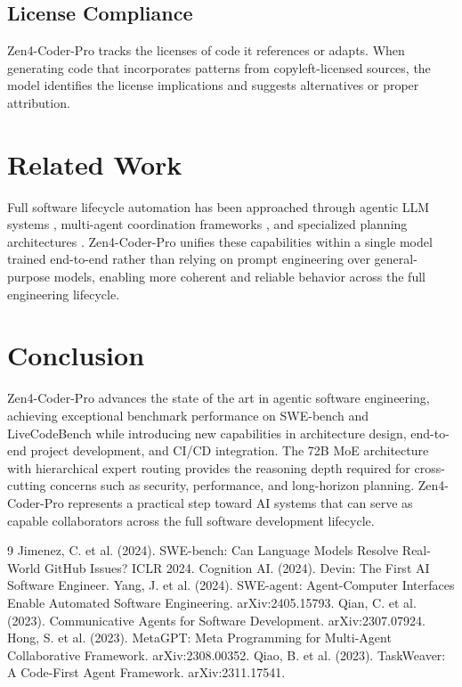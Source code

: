 \documentclass[11pt,a4paper]{article}
\begin{document}
\subsection{License Compliance}

Zen4-Coder-Pro tracks the licenses of code it references or adapts. When generating code that incorporates patterns from copyleft-licensed sources, the model identifies the license implications and suggests alternatives or proper attribution.

\section{Related Work}

Full software lifecycle automation has been approached through agentic LLM systems \cite{devin,swebenchagent}, multi-agent coordination frameworks \cite{chatdev,metagpt}, and specialized planning architectures \cite{taskweaver}. Zen4-Coder-Pro unifies these capabilities within a single model trained end-to-end rather than relying on prompt engineering over general-purpose models, enabling more coherent and reliable behavior across the full engineering lifecycle.

\section{Conclusion}

Zen4-Coder-Pro advances the state of the art in agentic software engineering, achieving exceptional benchmark performance on SWE-bench and LiveCodeBench while introducing new capabilities in architecture design, end-to-end project development, and CI/CD integration. The 72B MoE architecture with hierarchical expert routing provides the reasoning depth required for cross-cutting concerns such as security, performance, and long-horizon planning. Zen4-Coder-Pro represents a practical step toward AI systems that can serve as capable collaborators across the full software development lifecycle.

\begin{thebibliography}{9}
 Jimenez, C. et al. (2024). SWE-bench: Can Language Models Resolve Real-World GitHub Issues? ICLR 2024.
 Cognition AI. (2024). Devin: The First AI Software Engineer.
 Yang, J. et al. (2024). SWE-agent: Agent-Computer Interfaces Enable Automated Software Engineering. arXiv:2405.15793.
 Qian, C. et al. (2023). Communicative Agents for Software Development. arXiv:2307.07924.
 Hong, S. et al. (2023). MetaGPT: Meta Programming for Multi-Agent Collaborative Framework. arXiv:2308.00352.
 Qiao, B. et al. (2023). TaskWeaver: A Code-First Agent Framework. arXiv:2311.17541.
\end{thebibliography}
\end{document}
